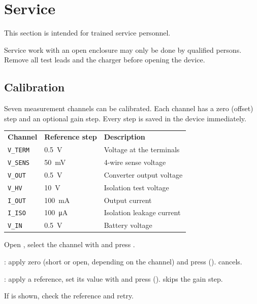 \section{Service}
\label{sec:service}

This section is intended for trained service personnel.

\begin{warning}
    Service work with an open enclosure may only be done by qualified persons.
    Remove all test leads and the charger before opening the device.
\end{warning}

\subsection{Calibration}
\label{sec:calibration}
Seven measurement channels can be calibrated. Each channel has a zero (offset) step and an
optional gain step. Every step is saved in the device immediately.

\begin{tabular}{llp{8cm}}
    \rowcolor{gray} \textbf{Channel} & \textbf{Reference step} & \textbf{Description} \\
    \texttt{V\_TERM} & \qty{0.5}{\volt}           & Voltage at the terminals \\
    \texttt{V\_SENS} & \qty{50}{\milli\volt}      & 4-wire sense voltage \\
    \texttt{V\_OUT}  & \qty{0.5}{\volt}           & Converter output voltage \\
    \texttt{V\_HV}   & \qty{10}{\volt}            & Isolation test voltage \\
    \texttt{I\_OUT}  & \qty{100}{\milli\ampere}   & Output current \\
    \texttt{I\_ISO}  & \qty{100}{\micro\ampere}   & Isolation leakage current \\
    \texttt{V\_IN}   & \qty{0.5}{\volt}           & Battery voltage \\
\end{tabular}

\begin{steps}
    \item Open , select the channel with \enc{} and press .
    \item {}: apply zero (short or open, depending on the channel) and press  ().
           cancels.
    \item {}: apply a reference, set its value with \enc{} and press
           ().  skips the gain step.
    \item If  is shown, check the reference and retry.
\end{steps}

